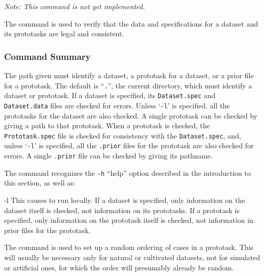 \newpage

%
%


{\em Note: This command is not yet implemented.}

The \dcheck{} command is used to verify that the data and specifications
for a dataset and its prototasks are legal and consistent.

\subsubsection*{Command Summary}

The path given \dcheck{} must identify a dataset, a prototask for a
dataset, or a prior file for a prototask.  The default is
``\texttt{.}'', the current directory, which must identify a 
dataset or prototask.  If a dataset is specified, its
\texttt{Dataset.spec} and \texttt{Dataset.data} files are checked for
errors.  Unless `\texttt{-l}' is specified, all the prototasks for the
dataset are also checked.  A single prototask can be checked by giving
a path to that prototask.  When a prototask is checked, the
\texttt{Prototask.spec} file is checked for consistency with the
\texttt{Dataset.spec}, and, unless `\texttt{-l}' is specified, all the
\texttt{.prior} files for the prototask are also checked for errors.
A single \texttt{.prior} file can be checked by giving its pathname.

The \dcheck{} command recognizes the \texttt{-h} ``help'' option described in
the introduction to this section, as well as:
\begin{ttdescription}
\item[-l] 
    This causes \dcheck{} to run locally.  If a dataset is specified,
    only information on the dataset itself is checked, not information
    on its prototasks.  If a prototask is specified, only information on
    the prototask itself is checked, not information in prior files for the
    prototask.
\end{ttdescription}

%
%


The \dgenorder{} command is used to set up a random ordering of cases
in a prototask.  This will usually be necessary only for natural or
cultivated datasets, not for simulated or artificial ones, for which
the order will presumably already be random.

